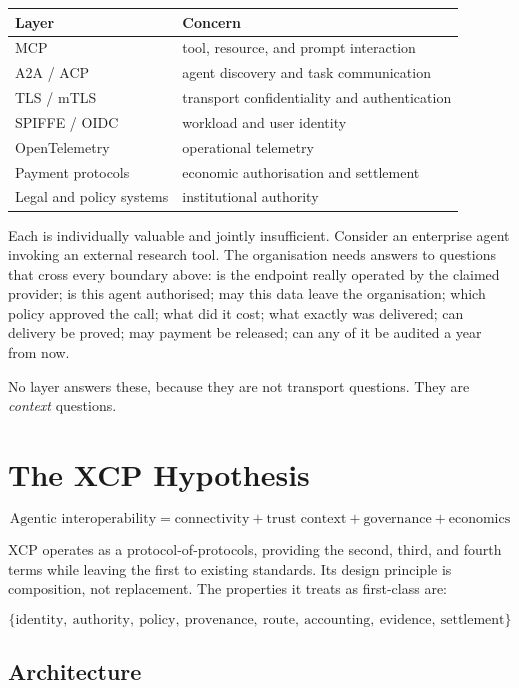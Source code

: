 \documentclass[11pt]{article}
\begin{document}
\begin{center}
\small
\begin{tabular}{@{}ll@{}}
\toprule
\textbf{Layer} & \textbf{Concern} \\
\midrule
MCP & tool, resource, and prompt interaction \\
A2A / ACP & agent discovery and task communication \\
TLS / mTLS & transport confidentiality and authentication \\
SPIFFE / OIDC & workload and user identity \\
OpenTelemetry & operational telemetry \\
Payment protocols & economic authorisation and settlement \\
Legal and policy systems & institutional authority \\
\bottomrule
\end{tabular}
\end{center}

Each is individually valuable and jointly insufficient. Consider an enterprise
agent invoking an external research tool. The organisation needs answers to
questions that cross every boundary above: is the endpoint really operated by the
claimed provider; is this agent authorised; may this data leave the organisation;
which policy approved the call; what did it cost; what exactly was delivered; can
delivery be proved; may payment be released; can any of it be audited a year
from now.

No layer answers these, because they are not transport questions. They are
\emph{context} questions.

\section{The XCP Hypothesis}

\[
\text{Agentic interoperability} = \text{connectivity} + \text{trust context} +
\text{governance} + \text{economics}
\]

XCP operates as a protocol-of-protocols, providing the second, third, and fourth
terms while leaving the first to existing standards. Its design principle is
composition, not replacement. The properties it treats as first-class are:

\[
\{\text{identity},\ \text{authority},\ \text{policy},\ \text{provenance},\
\text{route},\ \text{accounting},\ \text{evidence},\ \text{settlement}\}
\]

\subsection{Architecture}
\end{document}
